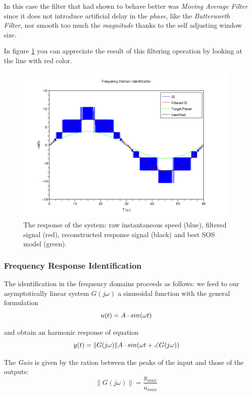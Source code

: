 In this case the filter that had shown to behave better was \textit{Moving Average Filter} since it does not introduce artificial delay in the \textit{phase}, like the \textit{Butterworth Filter}, nor smooth too much the \textit{magnitude} thanks to the self adjusting window size.

In figure \ref{fig:frequencyAvgSin} you can appreciate the result of this filtering operation by looking at the line with red color.

\begin{figure}[htbp]
\center
  \includegraphics[scale=0.16]{FIGURES_1/frequencyAvgSin.png}
  \caption{The response of the system: raw instantaneous speed (blue), filtered signal (red), reconstructed response signal (black) and best SOS model (green).}
  \label{fig:frequencyAvgSin}
\end{figure}

\subsubsection{Frequency Response Identification}

The identification in the frequency domains proceeds as follows: we feed to our asymptotically linear system $G(j\omega{})$ a sinusoidal function with the general formulation
\[
u(t) = A\small{}\cdot{} sin(\omega{}t)
\]

and obtain an harmonic response of equation
\[
y(t) = \|G(j\omega{})\|A\small{}\cdot{}sin(\omega{}t+\angle{G(j\omega{})})
\]

The \emph{Gain}  is given by the ration between the peaks of the input and those of the outputs:
\[
\|G(j\omega{})\| = \frac{y_{max}}{u_{max}}
\]

